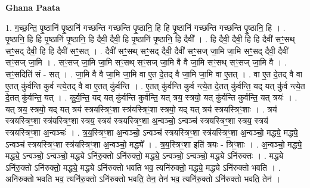 \documentclass[17pt]{extarticle}
\begin{document}
\textbf{Ghana Paata } \newline

1. ग॒च्छ॒न्ति॒ पृ॒ष्ठानि॑ पृ॒ष्ठानि॑ गच्छन्ति गच्छन्ति पृ॒ष्ठानि॒ हि हि पृ॒ष्ठानि॑ गच्छन्ति गच्छन्ति पृ॒ष्ठानि॒ हि । . पृ॒ष्ठानि॒ हि हि पृ॒ष्ठानि॑ पृ॒ष्ठानि॒ हि दैवी॒ दैवी॒ हि पृ॒ष्ठानि॑ पृ॒ष्ठानि॒ हि दैवी᳚ । . हि दैवी॒ दैवी॒ हि हि दैवी॑ सꣳ॒॒सथ् सꣳ॒॒सद् दैवी॒ हि हि दैवी॑ सꣳ॒॒सत् । . दैवी॑ सꣳ॒॒सथ् सꣳ॒॒सद् दैवी॒ दैवी॑ सꣳ॒॒सज् जा॒मि जा॒मि सꣳ॒॒सद् दैवी॒ दैवी॑ सꣳ॒॒सज् जा॒मि । . सꣳ॒॒सज् जा॒मि जा॒मि सꣳ॒॒सथ् सꣳ॒॒सज् जा॒मि वै वै जा॒मि सꣳ॒॒सथ् सꣳ॒॒सज् जा॒मि वै । . सꣳ॒॒सदिति॑ सं - सत् । . जा॒मि वै वै जा॒मि जा॒मि वा ए॒त दे॒तद् वै जा॒मि जा॒मि वा ए॒तत् । . वा ए॒त दे॒तद् वै वा ए॒तत् कु॑र्वन्ति कुर्व न्त्ये॒तद् वै वा ए॒तत् कु॑र्वन्ति । . ए॒तत् कु॑र्वन्ति कुर्व न्त्ये॒त दे॒तत् कु॑र्वन्ति॒ यद् यत् कु॑र्व न्त्ये॒त दे॒तत् कु॑र्वन्ति॒ यत् । . कु॒र्व॒न्ति॒ यद् यत् कु॑र्वन्ति कुर्वन्ति॒ यत् त्रय॒ स्त्रयो॒ यत् कु॑र्वन्ति कुर्वन्ति॒ यत् त्रयः॑ । . यत् त्रय॒ स्त्रयो॒ यद् यत् त्रय॑ स्त्रयस्त्रिꣳ॒॒शा स्त्र॑यस्त्रिꣳ॒॒शा स्त्रयो॒ यद् यत् त्रय॑ स्त्रयस्त्रिꣳ॒॒शाः । . त्रय॑ स्त्रयस्त्रिꣳ॒॒शा स्त्र॑यस्त्रिꣳ॒॒शा स्त्रय॒ स्त्रय॑ स्त्रयस्त्रिꣳ॒॒शा अ॒न्वञ्चो॒ ऽन्वञ्च॑ स्त्रयस्त्रिꣳ॒॒शा स्त्रय॒ स्त्रय॑ स्त्रयस्त्रिꣳ॒॒शा अ॒न्वञ्चः॑ । . त्र॒य॒स्त्रिꣳ॒॒शा अ॒न्वञ्चो॒ ऽन्वञ्च॑ स्त्रयस्त्रिꣳ॒॒शा स्त्र॑यस्त्रिꣳ॒॒शा अ॒न्वञ्चो॒ मद्ध्ये॒ मद्ध्ये॒ ऽन्वञ्च॑ स्त्रयस्त्रिꣳ॒॒शा स्त्र॑यस्त्रिꣳ॒॒शा अ॒न्वञ्चो॒ मद्ध्ये᳚ । . त्र॒य॒स्त्रिꣳ॒॒शा इति॑ त्रयः - त्रिꣳ॒॒शाः । . अ॒न्वञ्चो॒ मद्ध्ये॒ मद्ध्ये॒ ऽन्वञ्चो॒ ऽन्वञ्चो॒ मद्ध्ये ऽनि॑रु॒क्तो ऽनि॑रुक्तो॒ मद्ध्ये॒ ऽन्वञ्चो॒ ऽन्वञ्चो॒ मद्ध्ये ऽनि॑रुक्तः । . मद्ध्ये ऽनि॑रु॒क्तो ऽनि॑रुक्तो॒ मद्ध्ये॒ मद्ध्ये ऽनि॑रुक्तो भवति भव॒ त्यनि॑रुक्तो॒ मद्ध्ये॒ मद्ध्ये ऽनि॑रुक्तो भवति । . अनि॑रुक्तो भवति भव॒ त्यनि॑रु॒क्तो ऽनि॑रुक्तो भवति॒ तेन॒ तेन॑ भव॒ त्यनि॑रु॒क्तो ऽनि॑रुक्तो भवति॒ तेन॑ । \newline
\end{document}

